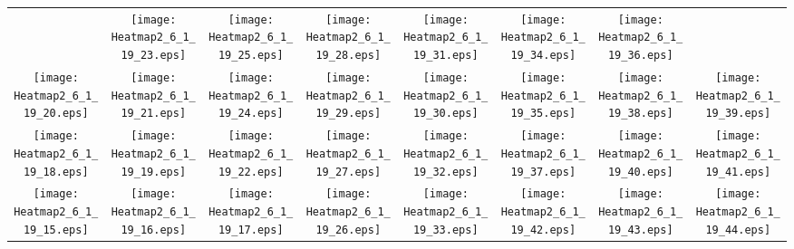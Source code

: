 \documentclass{standalone}
\begin{document}
\renewcommand{\arraystretch}{0}
\setlength{\tabcolsep}{0pt}
\begin{tabular}{ *8{c} }
 & \texttt{[image: Heatmap2\_6\_1\_19\_23.eps]} & \texttt{[image: Heatmap2\_6\_1\_19\_25.eps]} & \texttt{[image: Heatmap2\_6\_1\_19\_28.eps]} & \texttt{[image: Heatmap2\_6\_1\_19\_31.eps]} & \texttt{[image: Heatmap2\_6\_1\_19\_34.eps]} & \texttt{[image: Heatmap2\_6\_1\_19\_36.eps]} &  \\
\texttt{[image: Heatmap2\_6\_1\_19\_20.eps]} & \texttt{[image: Heatmap2\_6\_1\_19\_21.eps]} & \texttt{[image: Heatmap2\_6\_1\_19\_24.eps]} & \texttt{[image: Heatmap2\_6\_1\_19\_29.eps]} & \texttt{[image: Heatmap2\_6\_1\_19\_30.eps]} & \texttt{[image: Heatmap2\_6\_1\_19\_35.eps]} & \texttt{[image: Heatmap2\_6\_1\_19\_38.eps]} & \texttt{[image: Heatmap2\_6\_1\_19\_39.eps]} \\
\texttt{[image: Heatmap2\_6\_1\_19\_18.eps]} & \texttt{[image: Heatmap2\_6\_1\_19\_19.eps]} & \texttt{[image: Heatmap2\_6\_1\_19\_22.eps]} & \texttt{[image: Heatmap2\_6\_1\_19\_27.eps]} & \texttt{[image: Heatmap2\_6\_1\_19\_32.eps]} & \texttt{[image: Heatmap2\_6\_1\_19\_37.eps]} & \texttt{[image: Heatmap2\_6\_1\_19\_40.eps]} & \texttt{[image: Heatmap2\_6\_1\_19\_41.eps]} \\
\texttt{[image: Heatmap2\_6\_1\_19\_15.eps]} & \texttt{[image: Heatmap2\_6\_1\_19\_16.eps]} & \texttt{[image: Heatmap2\_6\_1\_19\_17.eps]} & \texttt{[image: Heatmap2\_6\_1\_19\_26.eps]} & \texttt{[image: Heatmap2\_6\_1\_19\_33.eps]} & \texttt{[image: Heatmap2\_6\_1\_19\_42.eps]} & \texttt{[image: Heatmap2\_6\_1\_19\_43.eps]} & \texttt{[image: Heatmap2\_6\_1\_19\_44.eps]} \\

\end{tabular}
\end{document}
